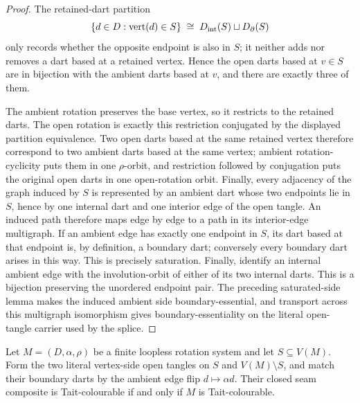 \begin{proof}
The retained-dart partition
\[
 \{d\in D: \operatorname{vert}(d)\in S\}
   \;\cong\; D_{\rm int}(S)\sqcup D_{\partial}(S)
\]
only records whether the opposite endpoint is also in \(S\); it neither
adds nor removes a dart based at a retained vertex.  Hence the open darts
based at \(v\in S\) are in bijection with the ambient darts based at \(v\),
and there are exactly three of them.

The ambient rotation preserves the base vertex, so it restricts to the
retained darts.  The open rotation is exactly this restriction conjugated
by the displayed partition equivalence.  Two open darts based at the same
retained vertex therefore correspond to two ambient darts based at the same
vertex; ambient rotation-cyclicity puts them in one \(\rho\)-orbit, and
restriction followed by conjugation puts the original open darts in one
open-rotation orbit.  Finally, every adjacency of the graph induced by \(S\)
is represented by an ambient dart whose two endpoints lie in \(S\), hence by
one internal dart and one interior edge of the open tangle.  An induced path
therefore maps edge by edge to a path in its interior-edge multigraph.  If an
ambient edge has exactly one endpoint in \(S\), its dart based at that endpoint
is, by definition, a boundary dart; conversely every boundary dart arises in
this way.  This is precisely saturation.  Finally, identify an internal
ambient edge with the involution-orbit of either of its two internal darts.
This is a bijection preserving the unordered endpoint pair.  The preceding
saturated-side lemma makes the induced ambient side boundary-essential, and
transport across this multigraph isomorphism gives boundary-essentiality on
the literal open-tangle carrier used by the splice.
\end{proof}

\begin{lemma}
\label{lem:complementary-shore-tait-reassembly}
Let \(M=(D,\alpha,\rho)\) be a finite loopless rotation system and let
\(S\subseteq V(M)\).  Form the two literal vertex-side open tangles on \(S\)
and \(V(M)\setminus S\), and match their boundary darts by the ambient edge
flip \(d\mapsto\alpha d\).  Their closed seam composite is Tait-colourable if
and only if \(M\) is Tait-colourable.
\end{lemma}

